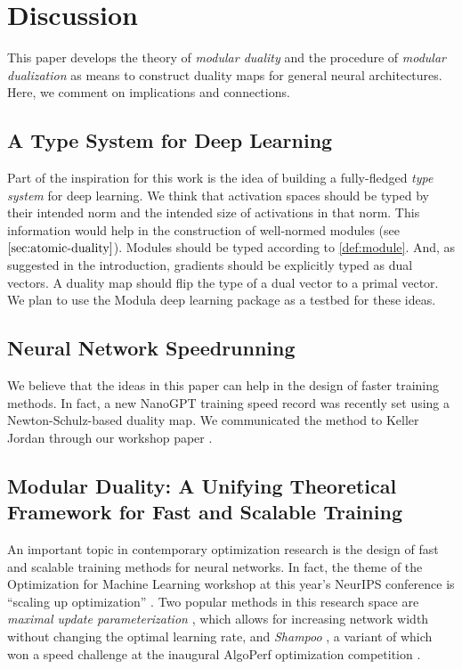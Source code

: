 \clearpage
\section{Discussion}
\label{sec:epilogue}

This paper develops the theory of \textit{modular duality} and the procedure of \textit{modular dualization} as means to construct duality maps for general neural architectures. Here, we comment on implications and connections.

\subsection{A Type System for Deep Learning}

Part of the inspiration for this work is the idea of building a fully-fledged \textit{type system} for deep learning. We think that activation spaces should be typed by their intended norm and the intended size of activations in that norm. This information would help in the construction of well-normed modules (see $\cref{sec:atomic-duality}$). Modules should be typed according to \cref{def:module}. And, as suggested in the introduction, gradients should be explicitly typed as dual vectors. A duality map should flip the type of a dual vector to a primal vector. We plan to use the Modula deep learning package \citep{modula} as a testbed for these ideas.

\subsection{Neural Network Speedrunning}

We believe that the ideas in this paper can help in the design of faster training methods. In fact, a new NanoGPT training speed record was recently set \citep{jordan2024cifar10} using a Newton-Schulz-based duality map. We communicated the method to Keller Jordan through our workshop paper \citep{bernstein2024old}.

\subsection{Modular Duality: A Unifying Theoretical Framework for Fast and Scalable Training}

An important topic in contemporary optimization research is the design of fast and scalable training methods for neural networks. In fact, the theme of the Optimization for Machine Learning workshop at this year's NeurIPS conference is ``scaling up optimization'' \citep{opt2024}. Two popular methods in this research space are \textit{maximal update parameterization} \citep[$\mu$P]{Yang2021TensorPI}, which allows for increasing network width without changing the optimal learning rate, and \textit{Shampoo} \citep{Gupta2018ShampooPS}, a variant of which \citep{Shi2023DistributedShampoo} won a speed challenge at the inaugural AlgoPerf optimization competition \citep{Dahl2023AlgoPerf}.

